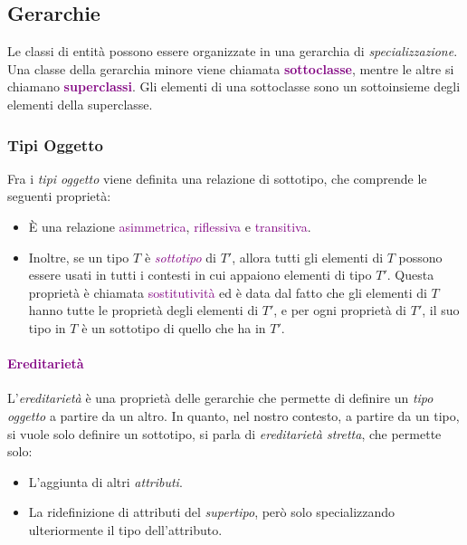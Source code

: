 \subsection{Gerarchie}

Le classi di entità possono essere organizzate in una gerarchia di
\emph{specializzazione}. Una classe della gerarchia minore viene chiamata
\textbf{\textcolor{purple}{sottoclasse}}, mentre le altre si chiamano
\textbf{\textcolor{purple}{superclassi}}. Gli elementi di una sottoclasse
sono un sottoinsieme degli elementi della superclasse.

\subsubsection{Tipi Oggetto}

Fra i \emph{tipi oggetto} viene definita una relazione di sottotipo, che comprende le seguenti proprietà:
\begin{itemize}
    \item È una relazione \textcolor{purple}{asimmetrica}, \textcolor{purple}{riflessiva} e
        \textcolor{purple}{transitiva}.
    \item Inoltre, se un tipo $T$ è \emph{\textcolor{purple}{sottotipo}} di $T'$, allora
        tutti gli elementi di $T$ possono essere usati in tutti i contesti in cui appaiono elementi
        di tipo $T'$. Questa proprietà è chiamata \textcolor{purple}{sostitutività} ed è data dal fatto
        che gli elementi di $T$ hanno tutte le proprietà degli elementi di $T'$, e per ogni proprietà di $T'$,
        il suo tipo in $T$ è un sottotipo di quello che ha in $T'$. 
\end{itemize}

\paragraph{\textcolor{purple}{Ereditarietà}} L'\emph{ereditarietà} è una proprietà delle gerarchie
che permette di definire un \emph{tipo oggetto} a partire da un altro. In quanto, nel nostro contesto,
a partire da un tipo, si vuole solo definire un sottotipo, si parla di \emph{ereditarietà stretta}, che permette solo:
\begin{itemize}
    \item L'aggiunta di altri \emph{attributi}.
    \item La ridefinizione di attributi del \emph{supertipo}, però solo specializzando ulteriormente il tipo dell'attributo.
\end{itemize}

